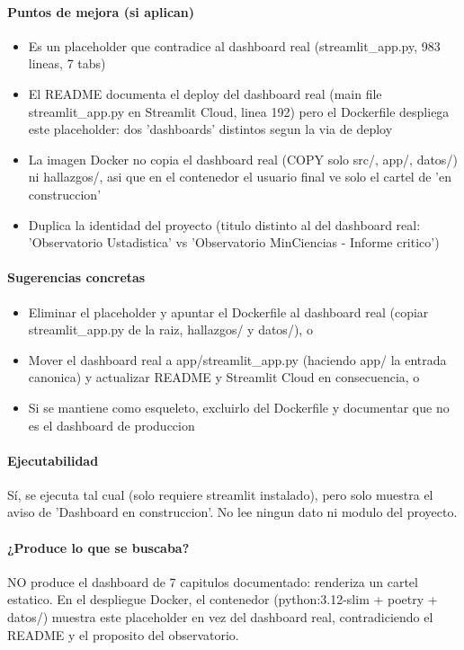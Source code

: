 \paragraph{Puntos de mejora (si aplican)}
\begin{itemize}
  \item Es un placeholder que contradice al dashboard real (streamlit\_app.py, 983 lineas, 7 tabs)
  \item El README documenta el deploy del dashboard real (main file streamlit\_app.py en Streamlit Cloud, linea 192) pero el Dockerfile despliega este placeholder: dos 'dashboards' distintos segun la via de deploy
  \item La imagen Docker no copia el dashboard real (COPY solo src/, app/, datos/) ni hallazgos/, asi que en el contenedor el usuario final ve solo el cartel de 'en construccion'
  \item Duplica la identidad del proyecto (titulo distinto al del dashboard real: 'Observatorio Ustadistica' vs 'Observatorio MinCiencias - Informe critico')
\end{itemize}

\paragraph{Sugerencias concretas}
\begin{itemize}
  \item Eliminar el placeholder y apuntar el Dockerfile al dashboard real (copiar streamlit\_app.py de la raiz, hallazgos/ y datos/), o
  \item Mover el dashboard real a app/streamlit\_app.py (haciendo app/ la entrada canonica) y actualizar README y Streamlit Cloud en consecuencia, o
  \item Si se mantiene como esqueleto, excluirlo del Dockerfile y documentar que no es el dashboard de produccion
\end{itemize}

\paragraph{Ejecutabilidad}
Sí, se ejecuta tal cual (solo requiere streamlit instalado), pero solo muestra el aviso de 'Dashboard en construccion'. No lee ningun dato ni modulo del proyecto.

\paragraph{¿Produce lo que se buscaba?}
NO produce el dashboard de 7 capitulos documentado: renderiza un cartel estatico. En el despliegue Docker, el contenedor (python:3.12-slim + poetry + datos/) muestra este placeholder en vez del dashboard real, contradiciendo el README y el proposito del observatorio.

